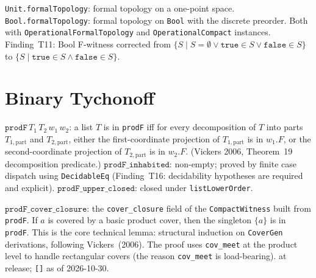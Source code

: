 \begin{definition}
\label{def:topology_instances}
\leanok
{}
\texttt{Unit.formalTopology}: formal topology on a one-point space.
\texttt{Bool.formalTopology}: formal topology on \texttt{Bool} with the
discrete preorder.
Both with \texttt{OperationalFormalTopology} and \texttt{OperationalCompact}
instances.  Finding~T11: Bool F-witness corrected from
$\{S \mid S = \emptyset \lor \texttt{true} \in S \lor \texttt{false} \in S\}$
to $\{S \mid \texttt{true} \in S \land \texttt{false} \in S\}$.
\end{definition}

\section{Binary Tychonoff}
\label{sec:topology_tychonoff}

\begin{definition}
\label{def:prodF}
\leanok
{}
$\texttt{prodF}\,T_1\,T_2\,w_1\,w_2$: a list $T$ is in \texttt{prodF}
iff for every decomposition of $T$ into parts $T_{1,\text{part}}$ and
$T_{2,\text{part}}$, either the first-coordinate projection of
$T_{1,\text{part}}$ is in $w_1.F$, or the second-coordinate projection
of $T_{2,\text{part}}$ is in $w_2.F$.
(Vickers 2006, Theorem~19 decomposition predicate.)
$\texttt{prodF\_inhabited}$: non-empty; proved by finite case dispatch
using \texttt{DecidableEq} (Finding~T16: decidability hypotheses
are required and explicit).
$\texttt{prodF\_upper\_closed}$: closed under \texttt{listLowerOrder}.
\end{definition}

\begin{theorem}
\label{thm:prodF_cover_closure}
\leanok
{}
$\texttt{prodF\_cover\_closure}$: the \texttt{cover\_closure} field of
the \texttt{CompactWitness} built from \texttt{prodF}.
If $a$ is covered by a basic product cover, then the singleton $\{a\}$ is
in \texttt{prodF}.
This is the core technical lemma: structural induction on
\texttt{CoverGen} derivations, following Vickers~(2006).
The proof uses \texttt{cov\_meet} at the product level to handle
rectangular covers (the reason \texttt{cov\_meet} is load-bearing).
 at release; \texttt{[]} as of 2026-10-30.
\end{theorem}

